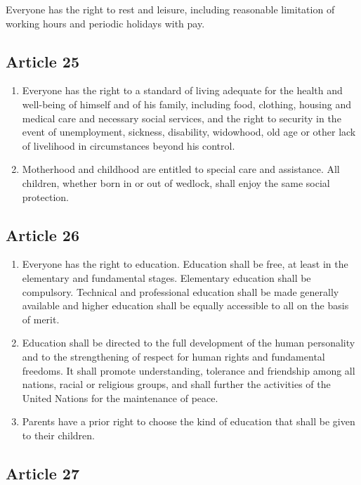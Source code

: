 \documentclass[
  titlepage,
  openright,
  DIV=calc,
  toc=listof,
  listof=nochaptergap]{scrbook}
\begin{document}
Everyone has the right to rest and leisure, including reasonable
limitation of working hours and periodic holidays with pay.

\subsection{Article 25}\label{article-25-3}

\begin{enumerate}
\def\labelenumi{\arabic{enumi}.}
\item
  Everyone has the right to a standard of living adequate for the health
  and well-being of himself and of his family, including food, clothing,
  housing and medical care and necessary social services, and the right
  to security in the event of unemployment, sickness, disability,
  widowhood, old age or other lack of livelihood in circumstances beyond
  his control.
\item
  Motherhood and childhood are entitled to special care and assistance.
  All children, whether born in or out of wedlock, shall enjoy the same
  social protection.
\end{enumerate}

\subsection{Article 26}\label{article-26-3}

\begin{enumerate}
\def\labelenumi{\arabic{enumi}.}
\item
  Everyone has the right to education. Education shall be free, at least
  in the elementary and fundamental stages. Elementary education shall
  be compulsory. Technical and professional education shall be made
  generally available and higher education shall be equally accessible
  to all on the basis of merit.
\item
  Education shall be directed to the full development of the human
  personality and to the strengthening of respect for human rights and
  fundamental freedoms. It shall promote understanding, tolerance and
  friendship among all nations, racial or religious groups, and shall
  further the activities of the United Nations for the maintenance of
  peace.
\item
  Parents have a prior right to choose the kind of education that shall
  be given to their children.
\end{enumerate}

\subsection{Article 27}\label{article-27-3}
\end{document}
